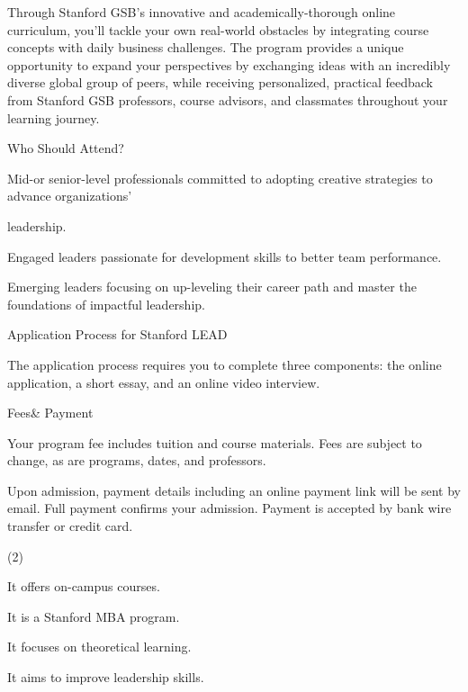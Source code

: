 \documentclass{英语试卷}
\begin{document}
\par Through Stanford GSB's innovative and academically-thorough online curriculum, you'll tackle your own real-world obstacles by integrating course concepts with daily business challenges. The program provides a unique opportunity to expand your perspectives by exchanging ideas with an incredibly diverse global group of peers, while receiving personalized, practical feedback from Stanford GSB professors, course advisors, and classmates throughout your learning journey.\par
\par Who Should Attend?\par
\par Mid-or senior-level professionals committed to adopting creative strategies to advance organizations'\par
\par leadership.\par
\par Engaged leaders passionate for development skills to better team performance.\par
\par Emerging leaders focusing on up-leveling their career path and master the foundations of impactful leadership.\par
\par Application Process for Stanford LEAD\par
\par The application process requires you to complete three components: the online application, a short essay, and an online video interview.\par
\par Fees\& Payment\par
\par Your program fee includes tuition and course materials. Fees are subject to change, as are programs, dates, and professors.\par
\par Upon admission, payment details including an online payment link will be sent by email. Full payment confirms your admission. Payment is accepted by bank wire transfer or credit card.\par
{}
\begin{choices}(2)
  \item It offers on-campus courses.
  \item It is a Stanford MBA program.
  \item It focuses on theoretical learning.
  \item It aims to improve leadership skills.
\end{choices}
\end{document}

